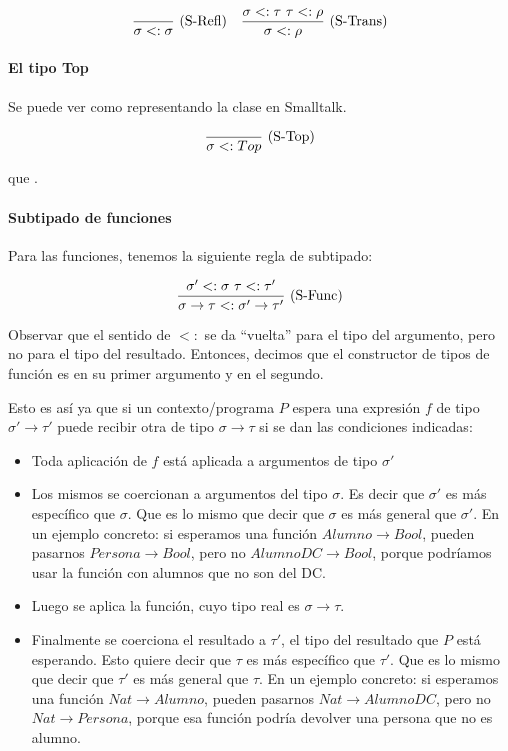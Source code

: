\[\deriv{}{\subt{\sigma}{\sigma}}{S-Refl} \quad \deriv{\subt{\sigma}{\tau}\ \subt{\tau}{\rho}}{\subt{\sigma}{\rho}}{S-Trans}\]

\paragraph{El tipo Top}

Se puede ver como representando la clase  en Smalltalk.

\[\frac{}{\sigma <: Top}\ \text{(S-Top)}\]

 que .

\paragraph{Subtipado de funciones}

Para las funciones, tenemos la siguiente regla de subtipado:

\[\deriv{\subt{\sigma'}{\sigma}\ \subt{\tau}{\tau'}}{\subt{\sigma\to\tau}{\sigma'\to\tau'}}{S-Func}\]

Observar que el sentido de $<:$ se da ``vuelta'' para el tipo del argumento, pero no para el tipo del resultado.
Entonces, decimos que el constructor de tipos de función es  en su primer argumento y  en el segundo.

Esto es así ya que si un contexto/programa $P$ espera una expresión $f$ de tipo $\sigma'\to\tau'$ puede recibir otra de tipo $\sigma\to\tau$ si se dan las condiciones indicadas:

\begin{itemize}
  \item Toda aplicación de $f$ está aplicada a argumentos de tipo $\sigma'$
  \item Los mismos se coercionan a argumentos del tipo $\sigma$. Es decir que $\sigma'$ es más específico que $\sigma$. Que es lo mismo que decir que $\sigma$ es más general que $\sigma'$. En un ejemplo concreto: si esperamos una función $Alumno \to Bool$, pueden pasarnos $Persona \to Bool$, pero no $AlumnoDC \to Bool$, porque podríamos usar la función con alumnos que no son del DC.
  \item Luego se aplica la función, cuyo tipo real es $\sigma\to\tau$.
  \item Finalmente se coerciona el resultado a $\tau'$, el tipo del resultado que $P$ está esperando. Esto quiere decir que $\tau$ es más específico que $\tau'$. Que es lo mismo que decir que $\tau'$ es más general que $\tau$. En un ejemplo concreto: si esperamos una función $Nat \to Alumno$, pueden pasarnos $Nat \to AlumnoDC$, pero no $Nat \to Persona$, porque esa función podría devolver una persona que no es alumno.
\end{itemize}

